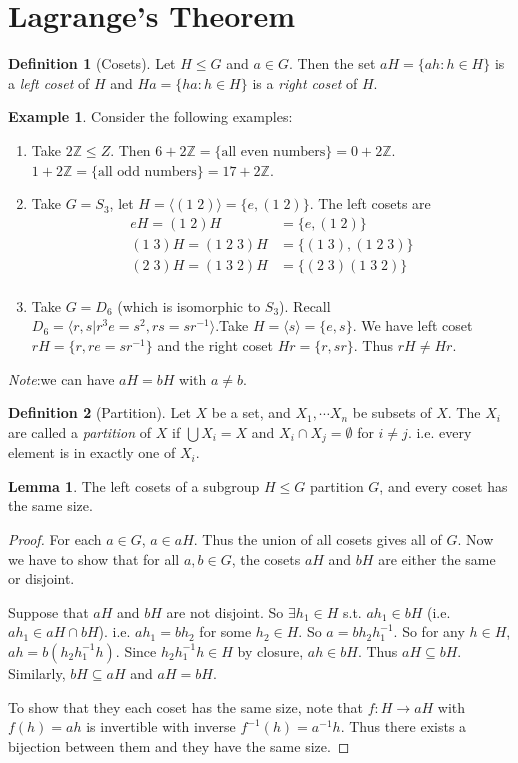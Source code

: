 \documentclass[a4paper]{article}
\theoremstyle{definition}
\newtheorem*{defi}{Definition}
\newtheorem*{eg}{Example}
\newtheorem*{lemma}{Lemma}
\newcommand{\note}{\noindent \emph{Note}:\;}
\newcommand{\Z}{\mathbb{Z}}
\newcommand{\bra}{\langle}
\newcommand{\ket}{\rangle}
\let\stdsection\section
\renewcommand\section{\newpage\stdsection}
\begin{document}
\section{Lagrange's Theorem}
\begin{defi}[Cosets]
  Let $H\leq G$ and $a\in G$. Then the set $aH =\{ah : h\in H\}$ is a \emph{left coset} of $H$  and $Ha = \{ha : h\in H\}$ is a \emph{right coset} of $H$.
\end{defi}
\begin{eg}
  Consider the following examples: 
  \begin{enumerate}
    \item Take $2\Z \leq Z$. Then $6 + 2\Z = \{\text{all even numbers}\} = 0 + 2\Z$. $1 + 2\Z = \{\text{all odd numbers}\} = 17 + 2\Z$. 
    \item Take $G = S_3$, let $H = \bra (1\; 2)\ket = \{e, (1\; 2)\}$. The left cosets are 
      \begin{align*}
        eH = (1\; 2)H &= \{e, (1\; 2)\}\\
        (1\; 3)H = (1\; 2\; 3)H &= \{(1\; 3), (1\; 2\; 3)\}\\
        (2\; 3)H = (1\; 3\; 2)H &= \{(2\; 3)(1\; 3\; 2)\}\\
      \end{align*}
    \item Take $G = D_6$ (which is isomorphic to $S_3$). Recall $D_6 = \bra r, s | r^3 e = s^2, rs = sr^{-1}\ket$.Take $H = \bra s\ket = \{e, s\}$. We have left coset $rH = \{r, re = sr^{-1}\}$ and the right coset $Hr = \{r, sr\}$. Thus $rH \not= Hr$. 
  \end{enumerate}
\end{eg}
\note we can have $aH = bH$ with $a\not= b$. 

\begin{defi}[Partition]
  Let $X$ be a set, and $X_1, \cdots X_n$ be subsets of $X$. The $X_i$ are called a \emph{partition} of $X$ if $\bigcup X_i = X$ and $X_i\cap X_j = \emptyset$ for $i\not= j$. i.e. every element is in exactly one of $X_i$.
\end{defi}

\begin{lemma}
  The left cosets of a subgroup $H\leq G$ partition $G$, and every coset has the same size.
\end{lemma}

\begin{proof}
  For each $a\in G$, $a\in aH$. Thus the union of all cosets gives all of $G$. Now we have to show that for all $a, b\in G$, the cosets $aH$ and $bH$ are either the same or disjoint.

  Suppose that $aH$ and $bH$ are not disjoint. So $\exists h_1\in H$ s.t. $ah_1\in bH$ (i.e. $ah_1\in aH\cap bH$). i.e. $ah_1 = bh_2$ for some $h_2\in H$. So $a = bh_2h_1^{-1}$. So for any $h\in H$, $ah = b(h_2h_1^{-1}h)$. Since $h_2h_1^{-1}h\in H$ by closure, $ah\in bH$. Thus $aH\subseteq bH$. Similarly, $bH\subseteq aH$ and $aH = bH$.

  To show that they each coset has the same size, note that $f: H \to aH$ with $f(h) = ah$ is invertible with inverse $f^{-1}(h) = a^{-1}h$. Thus there exists a bijection between them and they have the same size.
\end{proof}
\end{document}
